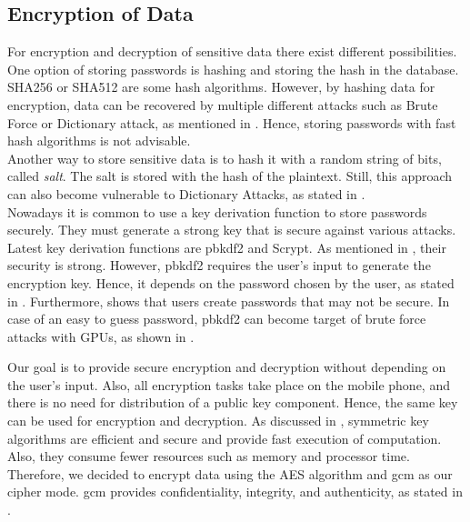 \subsection{Encryption of Data}\label{arch_encryption}
For encryption and decryption of sensitive data there exist different possibilities. One option of storing passwords is hashing and storing the hash in the database. SHA256 or SHA512 are some hash algorithms. However, by hashing data for encryption, data can be recovered by multiple different attacks such as Brute Force or Dictionary attack, as mentioned in \cite{ertaul2016implementation}. Hence, storing passwords with fast hash algorithms is not advisable. \\
Another way to store sensitive data is to hash it with a random string of bits, called \textit{salt}. The salt is stored with the hash of the plaintext. Still, this approach can also become vulnerable to Dictionary Attacks, as stated in \cite{3wrongways}. \\
Nowadays it is common to use a key derivation function to store passwords securely. They must generate a strong key that is secure against various attacks. Latest key derivation functions are \gls{pbkdf2} and Scrypt. As mentioned in \cite{ertaul2016implementation}, their security is strong.
However, \gls{pbkdf2} requires the user's input to generate the encryption key. Hence, it depends on the password chosen by the user, as stated in \cite{Agilebits}. Furthermore, \cite{YanBAG04} shows that users create passwords that may not be secure. In case of an easy to guess password, \gls{pbkdf2} can become target of brute force attacks with GPUs, as shown in \cite{DurmuthGKPYZ12}.

Our goal is to provide secure encryption and decryption without depending on the user's input. Also, all encryption tasks take place on the mobile phone, and there is no need for distribution of a public key component. Hence, the same key can be used for encryption and decryption. As discussed in \cite{bala2015asymmetric}, symmetric key algorithms are efficient and secure and provide fast execution of computation. Also, they consume fewer resources such as memory and processor time. \\ Therefore, we decided to encrypt data using the AES algorithm and \gls{gcm} as our cipher mode. \gls{gcm} provides confidentiality, integrity, and authenticity, as stated in \cite{AESJavaAndroid}.

